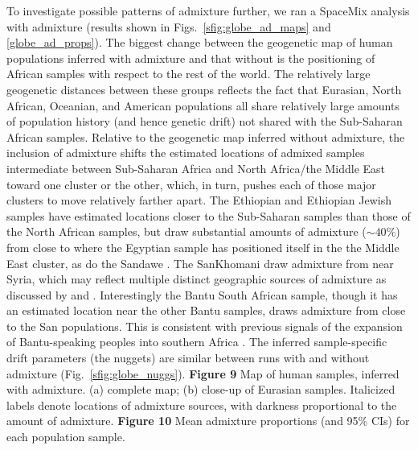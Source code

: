 \documentclass[10pt,letterpaper]{article}
\begin{document}
To investigate possible patterns of admixture further, we ran a SpaceMix analysis with admixture (results shown in Figs.\ \ref{sfig:globe_ad_maps} and \ref{globe_ad_props}). The biggest change between the geogenetic map of human populations inferred with admixture and that without is the positioning of African samples with respect to the rest of the world.  The relatively large geogenetic distances between these groups reflects the fact that Eurasian, North African, Oceanian, and American populations all share relatively large amounts of population history (and hence genetic drift) not shared with the Sub-Saharan African samples. Relative to the geogenetic map inferred without admixture, the inclusion of admixture shifts the estimated locations of admixed samples intermediate between Sub-Saharan Africa and North Africa/the Middle East toward one cluster or the other, which, in turn, pushes each of those major clusters to move relatively farther apart.  The Ethiopian and Ethiopian Jewish samples have estimated locations closer to the Sub-Saharan samples than those of the North African samples, but draw substantial amounts of admixture ($\sim 40\%$) from close to where the Egyptian sample has positioned itself in the the Middle East cluster, as do the Sandawe \cite{hodgson_early_2014,Pickrell:12}. 
The SanKhomani draw admixture from near Syria, which may reflect multiple distinct geographic sources of admixture as discussed by \cite{Hellenthal} and \cite{Pickrell:14}. 
Interestingly the Bantu South African sample, though it has an estimated location near the other Bantu samples, draws admixture from close to the San populations. This is consistent with previous signals of the expansion of Bantu-speaking peoples into southern Africa  \cite{Pickrell:12,Jakobsson_genomic_2012,Pickrell:14,Hellenthal}.  The inferred sample-specific drift parameters (the nuggets) are similar between runs with and without admixture (Fig.\ \ref{sfig:globe_nuggs}).
%
\newline\newline
{\bf{Figure 9}}	Map of human samples, inferred with admixture. (a) complete map; (b) close-up of Eurasian samples.
    Italicized labels denote locations of admixture sources,
    with darkness proportional to the amount of admixture.
\newline\newline
%
\newline\newline
{\bf{Figure 10}}	Mean admixture proportions (and 95\% CIs) for each population sample.
\newline\newline
\end{document}
